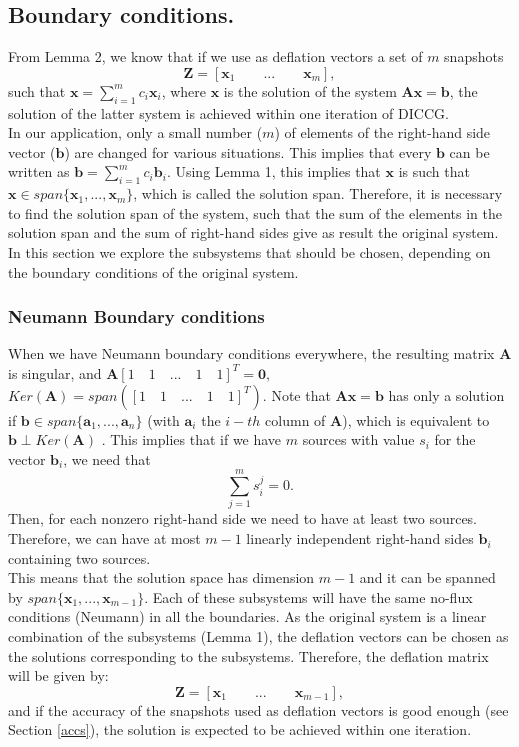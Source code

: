 \documentclass[12pt]{article}
\numberwithin{equation}{section}
\begin{document}
\subsection{Boundary conditions.}
From Lemma 2, we know that if we use as deflation vectors a set of $m$ snapshots $$\mathbf{Z}=[\mathbf{x}_1\qquad ...\qquad \mathbf{x}_m],$$ such that $\mathbf{x}=\sum_{i=1}^m {c}_i\mathbf{x}_i$, where $\mathbf{x}$ is the solution of the system $\mathbf{A}\mathbf{x}=\mathbf{b}$, the solution of the latter system is achieved within one iteration of DICCG. \\
In our application, only a small number ($m$) of elements of the right-hand side vector ($\mathbf{b}$)
are changed for various situations. This implies that every $\mathbf{b}$ can be written as $\mathbf{b}=\sum_{i=1}^m {c}_i\mathbf{b}_i.$ Using Lemma 1, this implies that $\mathbf{x}$ is such that 
$\mathbf{x}\in span\{ \mathbf{x}_1, ...,  \mathbf{x}_m\}$, which is called the solution span.
Therefore, it is necessary to find the solution span of the system, such that the sum of the elements in the solution span and the sum of right-hand sides give as result the original system. In this section we explore the subsystems that should be chosen, depending on the boundary conditions of the original system. 
\subsubsection*{{Neumann Boundary conditions}}
When we have Neumann boundary conditions everywhere, the resulting matrix $\mathbf{A}$ is singular, and
$\mathbf{A}[1\quad 1\quad ...\quad 1\quad 1]^T=\mathbf{0},$ $Ker(\mathbf{A})=span([1\quad 1\quad ...\quad 1\quad 1]^T)$. 
Note that $\mathbf{A}\mathbf{x}=\mathbf{b}$ has only a solution if $\mathbf{b}\in span\{\mathbf{a}_1,...,\mathbf{a}_n\}$ (with $\mathbf{a}_i$ the $i-th$ column of $\mathbf{A}$), which is equivalent to $\mathbf{b}\perp Ker(\mathbf{A}) $ \cite{Strang09}.
This implies that if we have $m$ sources with value ${s}_i$ for the vector $\mathbf{b}_i$, we need that 
$$\sum_{j=1}^ m {s}^{j}_i=0.$$
Then, for each nonzero  right-hand side we need to have at least two sources. Therefore, we can have at most $m-1$ linearly independent right-hand sides $\mathbf{b}_{i}$ containing two sources.\\
This means that the solution space has dimension $m-1$ and it can be spanned by $ span\{\mathbf{x}_1,...,\mathbf{x}_{m-1}\}$.
Each of these subsystems will have the same no-flux conditions (Neumann) in all the boundaries.
As the original system is a linear combination of the subsystems (Lemma 1), the deflation vectors can be chosen as the solutions corresponding to the subsystems. Therefore, the deflation matrix will be given by:
$$\mathbf{Z}=[\mathbf{x}_1\qquad ...\qquad \mathbf{x}_{m-1}],$$
and if the accuracy of the snapshots used as deflation vectors is good enough (see Section \ref{accs}), the solution is expected to be achieved within one iteration. 
\end{document}
